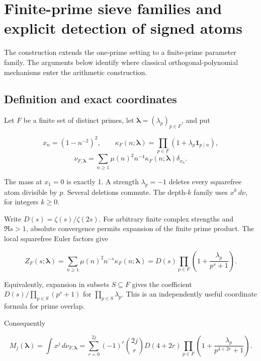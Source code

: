 \hypertarget{finite-prime-sieve-families-and-explicit-detection-of-signed-atoms}{%
\chapter[Prime sieves and signed-atom detection]{Finite-prime sieve families and explicit detection of signed
atoms}\label{app:sieve}\label{finite-prime-sieve-families-and-explicit-detection-of-signed-atoms}}

The construction extends the one-prime setting to a finite-prime parameter
family. The arguments below identify where classical orthogonal-polynomial
mechanisms enter the arithmetic construction.

\hypertarget{definition-and-exact-coordinates}{%
\section{Definition and exact
coordinates}\label{definition-and-exact-coordinates}}

Let \(F\) be a finite set of distinct primes, let
\(\boldsymbol\lambda=(\lambda_p)_{p\in F}\), and put

\[
x_n=(1-n^{-2})^2,\qquad
\kappa_F(n;\boldsymbol\lambda)=\prod_{p\in F}(1+\lambda_p\mathbf1_{p\mid n}),
\] \[
\nu_{F,\boldsymbol\lambda}
=\sum_{n\ge1}\mu(n)^2n^{-4}\kappa_F(n;\boldsymbol\lambda)\delta_{x_n}.
\]

The mass at \(x_1=0\) is exactly 1. A strength \(\lambda_p=-1\) deletes
every squarefree atom divisible by \(p\). Several deletions commute. The
depth-\(k\) family uses \(x^k\,d\nu\), for integers \(k\ge0\).

Write \(D(s)=\zeta(s)/\zeta(2s)\). For arbitrary finite complex
strengths and \(\Re s>1\), absolute convergence permits expansion of the
finite prime product. The local squarefree Euler factors give

\[
Z_F(s;\boldsymbol\lambda)
=\sum_{n\ge1}\mu(n)^2n^{-s}\kappa_F(n;\boldsymbol\lambda)
=D(s)\prod_{p\in F}\left(1+\frac{\lambda_p}{p^s+1}\right).
\]

Equivalently, expansion in subsets \(S\subseteq F\) gives the
coefficient \(D(s)/\prod_{p\in S}(p^s+1)\) for
\(\prod_{p\in S}\lambda_p\). This is an independently useful coordinate
formula for prime overlap.

Consequently

\[
M_j(\boldsymbol\lambda)=\int x^j\,d\nu_{F,\boldsymbol\lambda}
=\sum_{r=0}^{2j}(-1)^r\binom{2j}{r}
 D(4+2r)\prod_{p\in F}
 \left(1+\frac{\lambda_p}{p^{4+2r}+1}\right).
\tag{1}
\]

